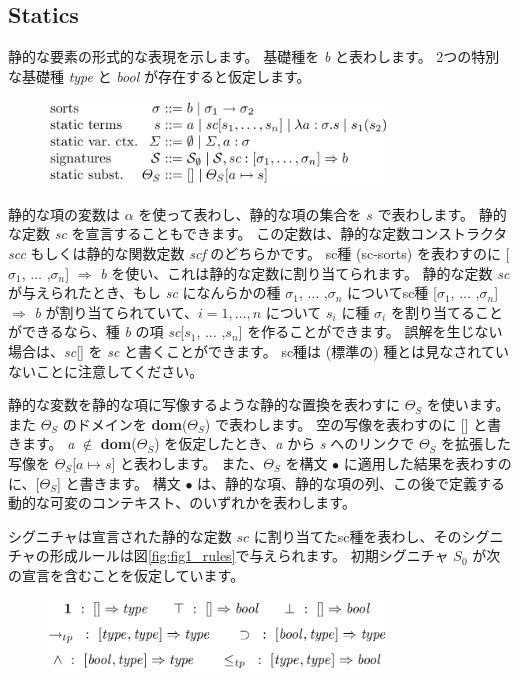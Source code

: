 \documentclass[submit,techreq,noauthor,onecolumn]{ipsj}
\begin{document}
\subsection{Statics}

静的な要素の形式的な表現を示します。
基礎種を {\it b} と表わします。
2つの特別な基礎種 {\it type} と {\it bool} が存在すると仮定します。

\begin{figure}[h]
\centering
\includegraphics[width=9cm]{img/infig21_formaldesc.png}
\end{figure}

\noindent 静的な項の変数は $\alpha$ を使って表わし、静的な項の集合を $s$ で表わします。
静的な定数 {\it sc} を宣言することもできます。
この定数は、静的な定数コンストラクタ {\it scc} もしくは静的な関数定数 {\it scf} のどちらかです。
sc種 (sc-sorts) を表わすのに [$\sigma_1$, $\ldots$ ,$\sigma_n$] $\Rightarrow$ {\it b} を使い、これは静的な定数に割り当てられます。
静的な定数 {\it sc} が与えられたとき、もし {\it sc} になんらかの種 $\sigma_1$, $\ldots$ ,$\sigma_n$ についてsc種 [$\sigma_1$, $\ldots$ ,$\sigma_n$] $\Rightarrow$ {\it b} が割り当てられていて、$i = 1, \ldots ,n$ について $s_i$ に種 $\sigma_i$ を割り当てることができるなら、種 {\it b} の項 {\it sc}[$s_1$, $\ldots$ ,$s_n$] を作ることができます。
誤解を生じない場合は、{\it sc}[] を {\it sc} と書くことができます。
sc種は (標準の) 種とは見なされていないことに注意してください。

静的な変数を静的な項に写像するような静的な置換を表わすに $\Theta_S$ を使います。
また $\Theta_S$ のドメインを {\bf dom}($\Theta_S$) で表わします。
空の写像を表わすのに [] と書きます。
{\it a} $\notin$ {\bf dom}($\Theta_S$) を仮定したとき、{\it a} から {\it s} へのリンクで $\Theta_S$ を拡張した写像を $\Theta_S$[$a \mapsto s$] と表わします。
また、$\Theta_S$ を構文 $\bullet$ に適用した結果を表わすのに、[$\Theta_S$] と書きます。
構文 $\bullet$ は、静的な項、静的な項の列、この後で定義する動的な可変のコンテキスト、のいずれかを表わします。

シグニチャは宣言された静的な定数 $sc$ に割り当てたsc種を表わし、そのシグニチャの形成ルールは図\ref{fig:fig1_rules}で与えられます。
初期シグニチャ $S_0$ が次の宣言を含むことを仮定しています。

\begin{figure}[h]
\centering
\includegraphics[width=9cm]{img/infig21_initialsig.png}
\end{figure}
\end{document}
